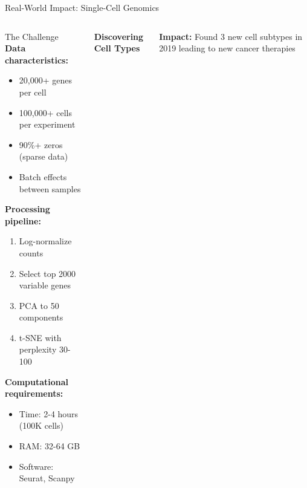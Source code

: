 \documentclass[aspectratio=169]{beamer}
\begin{document}
\begin{frame}{Real-World Impact: Single-Cell Genomics}
\begin{columns}
\begin{block}{The Challenge}
\textbf{Data characteristics:}
\begin{itemize}
\item 20,000+ genes per cell
\item 100,000+ cells per experiment
\item 90\%+ zeros (sparse data)
\item Batch effects between samples
\end{itemize}

\textbf{Processing pipeline:}
\begin{enumerate}
\item Log-normalize counts
\item Select top 2000 variable genes
\item PCA to 50 components
\item t-SNE with perplexity 30-100
\end{enumerate}

\textbf{Computational requirements:}
\begin{itemize}
\item Time: 2-4 hours (100K cells)
\item RAM: 32-64 GB
\item Software: Seurat, Scanpy
\end{itemize}
\end{block}

\begin{center}
\textbf{Discovering Cell Types}\\[3mm]
\end{center}

\textbf{Impact:} Found 3 new cell subtypes in 2019 leading to new cancer therapies
\end{columns}
\end{frame}
\end{document}

